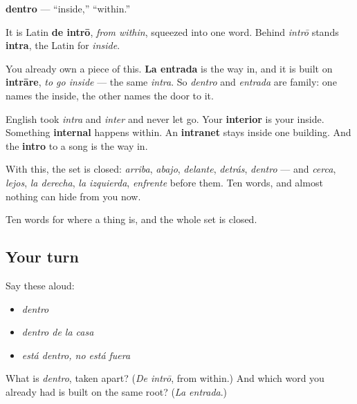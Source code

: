 \begin{cousinweb}
\textbf{dentro} — \textquotedblleft{}inside,\textquotedblright{} \textquotedblleft{}within.\textquotedblright{}

It is Latin \textbf{de intrō}, \emph{from within}, squeezed into one word. Behind \emph{intrō} stands \textbf{intra}, the Latin for \emph{inside}.

You already own a piece of this. \textbf{La entrada} is the way in, and it is built on \textbf{intrāre}, \emph{to go inside} — the same \emph{intra}. So \emph{dentro} and \emph{entrada} are family: one names the inside, the other names the door to it.

English took \emph{intra} and \emph{inter} and never let go. Your \textbf{interior} is your inside. Something \textbf{internal} happens within. An \textbf{intranet} stays inside one building. And the \textbf{intro} to a song is the way in.

With this, the set is closed: \emph{arriba}, \emph{abajo}, \emph{delante}, \emph{detrás}, \emph{dentro} — and \emph{cerca}, \emph{lejos}, \emph{la derecha}, \emph{la izquierda}, \emph{enfrente} before them. Ten words, and almost nothing can hide from you now.
\end{cousinweb}

\begin{grammarlens}[title={What you've built}]
Ten words for where a thing is, and the whole set is closed.
\end{grammarlens}

\subsection*{Your turn}
Say these aloud:

\begin{itemize}
\raggedright
  \item \emph{dentro}
  \item \emph{dentro de la casa}
  \item \emph{está dentro, no está fuera}
\end{itemize}

\begin{tcolorbox}[breakable,colback=teal!4,colframe=teal!35!black,title={Before you move on}]
What is \emph{dentro}, taken apart? (\emph{De intrō}, from within.) And which word you already had is built on the same root? (\emph{La entrada}.)
\end{tcolorbox}
